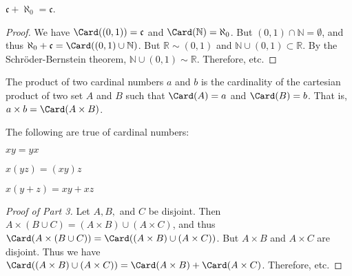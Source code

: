 \documentclass[crop=false,class=book,oneside]{standalone}
\begin{document}
            \begin{theorem*}
                $\mathfrak{c}+\aleph_{0}=\mathfrak{c}$.
            \end{theorem*}
            \begin{proof}
                We have $\Card((0,1))=\mathfrak{c}$ and
                $\Card(\mathbb{N})=\aleph_{0}$. But
                $(0,1)\cap\mathbb{N}=\emptyset$, and thus
                $\aleph_{0}+\mathfrak{c}%
                 =\Card((0,1)\cup\mathbb{N})$.
                But $\mathbb{R}\sim(0,1)$ and
                $\mathbb{N}\cup(0,1)\subset\mathbb{R}$.
                By the Schr\"{o}der-Bernstein theorem,
                $\mathbb{N}\cup(0,1)\sim\mathbb{R}$.
                Therefore, etc.
            \end{proof}
            \begin{definition}
                The product of two cardinal numbers $a$ and $b$
                is the cardinality of the cartesian product
                of two set $A$ and $B$ such that
                $\Card(A)=a$ and $\Card(B)=b$. That is,
                ${a}\times{b}=\Card({A}\times{B})$.
            \end{definition}
            \begin{theorem*}
                The following are true of cardinal numbers:
                \begin{enumerate}
                    \begin{multicols}{3}
                        \item $xy=yx$
                        \item $x(yz)=(xy)z$
                        \item $x(y+z)=xy+xz$
                    \end{multicols}
                \end{enumerate}
            \end{theorem*}
            \begin{proof}[Proof of Part 3]
                Let $A,B,$ and $C$ be disjoint.
                Then
                ${A}\times{({B}\cup{C})}%
                 =({A}\times{B})\cup({A}\times{C})$, and thus
                $\Card({A}\times{({B}\cup{C})})%
                 =\Card(({A}\times{B})\cup({A}\times{C}))$.
                But ${A}\times{B}$ and ${A}\times{C}$ are disjoint.
                Thus we have
                $\Card(({A}\times{B})\cup({A}\times{C}))%
                 =\Card({A}\times{B})+\Card({A}\times{C})$.
                Therefore, etc.
            \end{proof}
\end{document}
